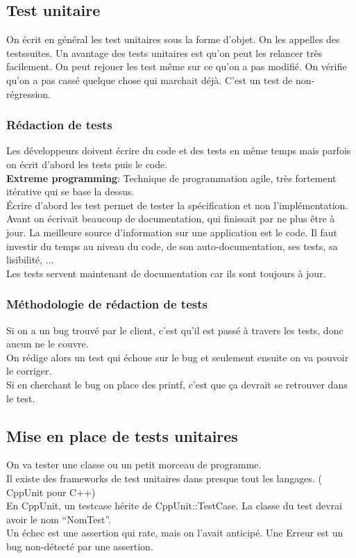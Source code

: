 \subsection{Test unitaire}
	On écrit en général les test unitaires sous la forme d’objet. On les appelles des testssuites. Un avantage des tests unitaires est qu’on peut les relancer très facilement. On peut rejouer les test même sur ce qu’on a pas modifié. On vérifie qu’on a pas cassé quelque chose qui marchait déjà. C’est un test de non-régression.


\subsubsection{Rédaction de tests}
	Les développeurs doivent écrire du code et des tests en même temps mais parfois on écrit d’abord les tests puis le code.
	\\\textbf{Extreme programming}: Technique de programmation agile, très fortement itérative qui se base la dessus.
	\\Écrire d’abord les test permet de tester la spécification et non l’implémentation.
	\\Avant on écrivait beaucoup de documentation, qui finissait par ne plus être à jour. La meilleure source d’information sur une application est le code. Il faut investir du temps au niveau du code, de son auto-documentation, ses tests, sa lisibilité, ...
	\\Les tests servent maintenant de documentation car ils sont toujours à jour.


\subsubsection{Méthodologie de rédaction de tests}
	Si on a un bug trouvé par le client, c’est qu’il est passé à travers les tests, donc aucun ne le couvre.
	\\On rédige alors un test qui échoue sur le bug et seulement ensuite on va pouvoir le corriger.
	\\Si en cherchant le bug on place des printf, c’est que ça devrait se retrouver dans le test.


\subsection{Mise en place de tests unitaires}
	On va tester une classe ou un petit morceau de programme.
	\\Il existe des frameworks de test unitaires dans presque tout les langages. ( CppUnit pour C++)
	\\En CppUnit, un testcase hérite de CppUnit::TestCase. La classe du test devrai avoir le nom “NomTest”.
	\\Un échec est une assertion qui rate, mais on l’avait anticipé. Une Erreur est un bug non-détecté par une assertion.


